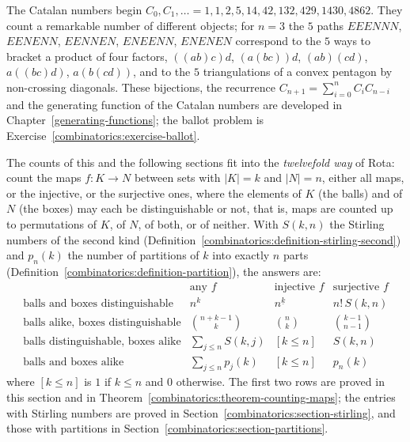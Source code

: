 \begin{example}\label{combinatorics:example-catalan}
The Catalan numbers begin $C_0, C_1, \ldots = 1, 1, 2, 5, 14, 42, 132, 429, 1430, 4862$. They count a remarkable number of different objects; for $n = 3$ the $5$ paths
$EEENNN$, $EENENN$, $EENNEN$, $ENEENN$, $ENENEN$ correspond to the $5$ ways to bracket a product of four factors, $((ab)c)d$, $(a(bc))d$, $(ab)(cd)$, $a((bc)d)$, $a(b(cd))$, and to the $5$
triangulations of a convex pentagon by non-crossing diagonals. These bijections, the recurrence $C_{n+1} = \sum_{i=0}^{n}C_iC_{n-i}$ and the generating function of the Catalan numbers are developed in
Chapter~\ref{generating-functions}; the ballot problem is Exercise~\ref{combinatorics:exercise-ballot}.
\end{example}

\begin{remark}\label{combinatorics:remark-twelvefold-way}
The counts of this and the following sections fit into the \emph{twelvefold way} of Rota: count the maps $f \colon K \to N$ between sets with $|K| = k$ and $|N| = n$, either all maps, or the injective,
or the surjective ones, where the elements of $K$ (the balls) and of $N$ (the boxes) may each be distinguishable or not, that is, maps are counted up to permutations of $K$, of $N$, of both, or of
neither. With $S(k, n)$ the Stirling numbers of the second kind (Definition~\ref{combinatorics:definition-stirling-second}) and $p_n(k)$ the number of partitions of $k$ into exactly $n$ parts
(Definition~\ref{combinatorics:definition-partition}), the answers are:
\[
\begin{array}{l|ccc}
 & \text{any } f & \text{injective } f & \text{surjective } f \\ \hline
\text{balls and boxes distinguishable} & n^k & n^{\underline{k}} & n!\,S(k, n) \\
\text{balls alike, boxes distinguishable} & \binom{n + k - 1}{k} & \binom{n}{k} & \binom{k - 1}{n - 1} \\
\text{balls distinguishable, boxes alike} & \sum_{j \leq n}S(k, j) & [k \leq n] & S(k, n) \\
\text{balls and boxes alike} & \sum_{j \leq n}p_j(k) & [k \leq n] & p_n(k)
\end{array}
\]
where $[k \leq n]$ is $1$ if $k \leq n$ and $0$ otherwise. The first two rows are proved in this section and in Theorem~\ref{combinatorics:theorem-counting-maps}; the entries with Stirling numbers
are proved in Section~\ref{combinatorics:section-stirling}, and those with partitions in Section~\ref{combinatorics:section-partitions}.
\end{remark}

